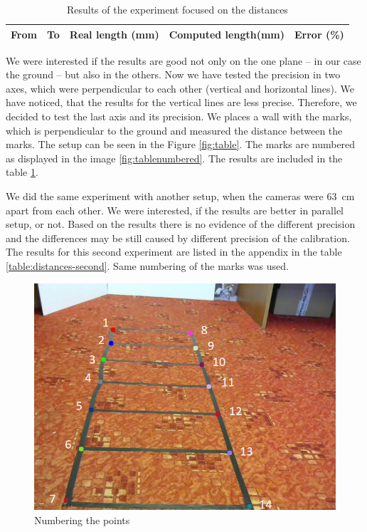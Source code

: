 \begin{table}
\centering
\begin{tabular}{|r|r|r|r|r|}
\hline
From	& To	& Real length (mm) & Computed length(mm) & Error (\%) \\
\hline
\hline

\hline
\end{tabular}
\caption{Results of the experiment focused on the distances}
\label{table:distances}
\end{table}

We were interested if the results are good not only on the one plane -- in our
case the ground -- but also in the others. Now we have tested the precision in
two axes, which were perpendicular to each other (vertical and horizontal
lines). We have noticed, that the results for the vertical lines are less
precise. Therefore, we decided to test the last axis and its precision. We places
a wall with the marks, which is perpendicular to the ground and measured the
distance between the marks. The setup can be seen in the Figure
\ref{fig:table}. The marks are numbered as displayed in the image
\ref{fig:tablenumbered}. The results are included in the table
\ref{table:distances}. 

We did the same experiment with another setup, when the cameras were 63~cm
apart from each other. We were interested, if the results are better in
parallel setup, or not. Based on the results there is no evidence of the
different precision and the differences may be still caused by different
precision of the calibration. The results for this second experiment are listed
in the appendix in the table \ref{table:distances-second}. Same numbering of
the marks was used.

\begin{figure}
\centering
\includegraphics[width=0.8\linewidth]{img/experiments/right-ladder-numbered.png}
\caption{Numbering the points}
\label{fig:ladder_numbered}
\end{figure}

